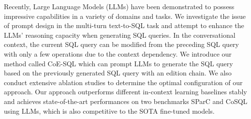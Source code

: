 Recently, Large Language Models (LLMs) have been demonstrated to possess impressive capabilities in a variety of domains and tasks. We investigate the issue of prompt design in the multi-turn text-to-SQL task and attempt to enhance the LLMs' reasoning capacity when generating SQL queries. In the conversational context, the current SQL query can be modified from the preceding SQL query with only a few operations due to the context dependency. We introduce our method called CoE-SQL which can prompt LLMs to generate the SQL query based on the previously generated SQL query with an edition chain. We also conduct extensive ablation studies to determine the optimal configuration of our approach. Our approach outperforms different in-context learning baselines stably and achieves state-of-the-art performances on two benchmarks SParC and CoSQL using LLMs, which is also competitive to the SOTA fine-tuned models.